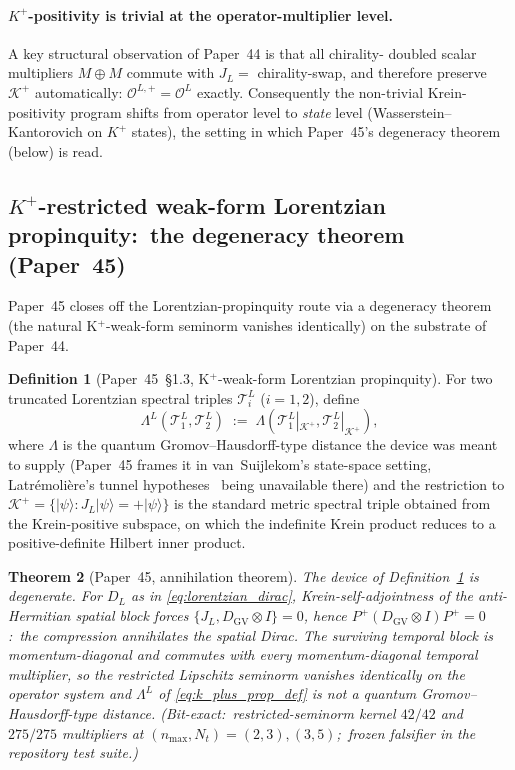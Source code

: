 \documentclass[11pt,a4paper]{article}
\theoremstyle{plain}
\newtheorem{theorem}{Theorem}[section]
\theoremstyle{definition}
\newtheorem{definition}[theorem]{Definition}
\newcommand{\nmax}{n_{\max}}
\newcommand{\Nt}{N_{t}}
\newcommand{\DGV}{D_{\mathrm{GV}}}
\newcommand{\DL}{D_{L}}
\newcommand{\JL}{J_{L}}
\newcommand{\Kplus}{\mathcal{K}^{+}}
\newcommand{\Op}{\mathcal{O}}
\newcommand{\Tcal}{\mathcal{T}}
\newcommand{\Lprop}{\Lambda^{L}}
\newcommand{\gvc}[2]{#2}
\begin{document}
\paragraph{$K^{+}$-positivity is trivial at the operator-multiplier
level.}
A key structural observation of Paper~44 is that all chirality-
doubled scalar multipliers $M \oplus M$ commute with $\JL =$
chirality-swap, and therefore preserve $\Kplus$ automatically:
$\Op^{L,+} = \Op^{L}$ exactly.  Consequently the non-trivial
Krein-positivity program shifts from operator level to \emph{state}
level (Wasserstein--Kantorovich on $K^{+}$ states), the setting in
which Paper~45's degeneracy theorem (below) is read.

\subsection{$K^{+}$-restricted weak-form Lorentzian propinquity:\ the degeneracy theorem (Paper~45)}

\gvc{p45-rates-spatial}{Paper~45 \cite{paper45} closes off the Lorentzian-propinquity route via a
degeneracy theorem (the natural K$^{+}$-weak-form seminorm vanishes
identically)} on the substrate of Paper~44.

\begin{definition}[Paper~45~\S 1.3, K$^{+}$-weak-form Lorentzian
propinquity]
\label{def:k_plus_prop}
For two truncated Lorentzian spectral triples
$\Tcal_{i}^{L}$ ($i = 1, 2$), define
\begin{equation}
\Lprop(\Tcal_{1}^{L}, \Tcal_{2}^{L})
\;:=\;
\Lambda(\Tcal_{1}^{L}|_{\Kplus}, \Tcal_{2}^{L}|_{\Kplus}),
\label{eq:k_plus_prop_def}
\end{equation}
where $\Lambda$ is the quantum Gromov--Hausdorff-type distance the
device was meant to supply (Paper~45 frames it in van~Suijlekom's
state-space setting, Latr\'emoli\`ere's tunnel
hypotheses~\cite{latremoliere_metric_st_2017,latremoliere2018} being
unavailable there) and the
restriction to $\Kplus = \{|\psi\rangle : \JL|\psi\rangle =
+|\psi\rangle\}$ is the standard metric spectral triple obtained from
the Krein-positive subspace, on which the indefinite Krein product
reduces to a positive-definite Hilbert inner product.
\end{definition}

\begin{theorem}[Paper~45, annihilation theorem]
\label{thm:p45_main}
The device of Definition~\ref{def:k_plus_prop} is degenerate.  For
$\DL$ as in \eqref{eq:lorentzian_dirac}, Krein-self-adjointness of
the anti-Hermitian spatial block forces
$\{\JL, \DGV \otimes I\} = 0$, hence
$P^{+}(\DGV \otimes I)P^{+} = 0$:\ the compression annihilates the
spatial Dirac.  The surviving temporal block is momentum-diagonal and
commutes with every momentum-diagonal temporal multiplier, so the
restricted Lipschitz seminorm vanishes identically on the operator
system and $\Lprop$ of \eqref{eq:k_plus_prop_def} is not a quantum
Gromov--Hausdorff-type distance.  (Bit-exact:\ restricted-seminorm
kernel $42/42$ and $275/275$ multipliers at
$(\nmax, \Nt) = (2,3), (3,5)$;\ frozen falsifier in the repository
test suite.)
\end{theorem}
\end{document}
